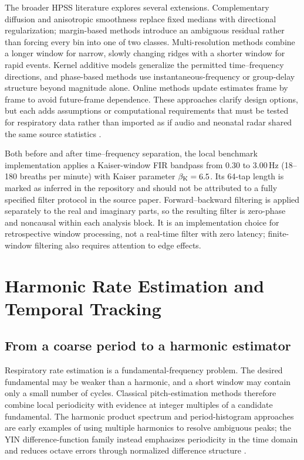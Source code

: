 The broader HPSS literature explores several extensions. Complementary diffusion and anisotropic
smoothness replace fixed medians with directional regularization; margin-based methods introduce
an ambiguous residual rather than forcing every bin into one of two classes. Multi-resolution
methods combine a longer window for narrow, slowly changing ridges with a shorter window for
rapid events. Kernel additive models generalize the permitted time--frequency directions, and
phase-based methods use instantaneous-frequency or group-delay structure beyond magnitude alone.
Online methods update estimates frame by frame to avoid future-frame dependence. These approaches
clarify design options, but each adds assumptions or computational requirements that must be tested
for respiratory data rather than imported as if audio and neonatal radar shared the same source
statistics \citep{ono2008realtime,driedger2014extending,tachibana2014two,tachibana2014harmonic,fitzgerald2014harmonic,cano2014phase,canadas2015online}.

Both before and after time--frequency separation, the local benchmark implementation applies a
Kaiser-window FIR bandpass from $0.30$ to $3.00\,\mathrm{Hz}$ (18--180 breaths per minute) with
Kaiser parameter $\beta_{\mathrm{K}}=6.5$. Its 64-tap length is marked as inferred in the repository and
should not be attributed to a fully specified filter protocol in the source paper.
Forward--backward filtering is applied separately to the real and imaginary parts, so the resulting
filter is zero-phase and noncausal within each analysis block. It is an implementation choice for
retrospective window processing, not a real-time filter with zero latency; finite-window filtering
also requires attention to edge effects.

\section{Harmonic Rate Estimation and Temporal Tracking}
\label{sec:ch2_tracking}

\subsection{From a coarse period to a harmonic estimator}

Respiratory rate estimation is a fundamental-frequency problem. The desired fundamental may be
weaker than a harmonic, and a short window may contain only a small number of cycles. Classical
pitch-estimation methods therefore combine local periodicity with evidence at integer multiples of
a candidate fundamental. The harmonic product spectrum and period-histogram approaches are early
examples of using multiple harmonics to resolve ambiguous peaks; the YIN difference-function
family instead emphasizes periodicity in the time domain and reduces octave errors through
normalized difference structure \citep{schroeder1968period,cheveigne2002yin}.

